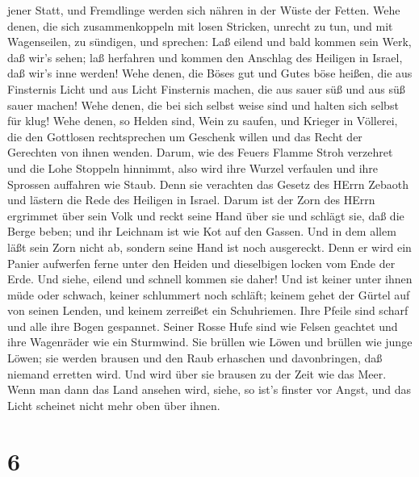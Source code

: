 jener Statt, und Fremdlinge werden sich nähren in der Wüste der Fetten.
 Wehe denen, die sich zusammenkoppeln mit losen Stricken,
unrecht zu tun, und mit Wagenseilen, zu sündigen,  und
sprechen: Laß eilend und bald kommen sein Werk, daß wir's sehen; laß
herfahren und kommen den Anschlag des Heiligen in Israel, daß wir's inne
werden!  Wehe denen, die Böses gut und Gutes böse heißen,
die aus Finsternis Licht und aus Licht Finsternis machen, die aus sauer
süß und aus süß sauer machen!  Wehe denen, die bei sich
selbst weise sind und halten sich selbst für klug!  Wehe
denen, so Helden sind, Wein zu saufen, und Krieger in Völlerei,
 die den Gottlosen rechtsprechen um Geschenk willen und das
Recht der Gerechten von ihnen wenden.  Darum, wie des
Feuers Flamme Stroh verzehret und die Lohe Stoppeln hinnimmt, also wird
ihre Wurzel verfaulen und ihre Sprossen auffahren wie Staub. Denn sie
verachten das Gesetz des HErrn Zebaoth und lästern die Rede des Heiligen
in Israel.  Darum ist der Zorn des HErrn ergrimmet über
sein Volk und reckt seine Hand über sie und schlägt sie, daß die Berge
beben; und ihr Leichnam ist wie Kot auf den Gassen. Und in dem allem
läßt sein Zorn nicht ab, sondern seine Hand ist noch ausgereckt.
 Denn er wird ein Panier aufwerfen ferne unter den Heiden
und dieselbigen locken vom Ende der Erde. Und siehe, eilend und schnell
kommen sie daher!  Und ist keiner unter ihnen müde oder
schwach, keiner schlummert noch schläft; keinem gehet der Gürtel auf von
seinen Lenden, und keinem zerreißet ein Schuhriemen.  Ihre
Pfeile sind scharf und alle ihre Bogen gespannet. Seiner Rosse Hufe sind
wie Felsen geachtet und ihre Wagenräder wie ein Sturmwind. 
Sie brüllen wie Löwen und brüllen wie junge Löwen; sie werden brausen
und den Raub erhaschen und davonbringen, daß niemand erretten wird.
 Und wird über sie brausen zu der Zeit wie das Meer. Wenn
man dann das Land ansehen wird, siehe, so ist's finster vor Angst, und
das Licht scheinet nicht mehr oben über ihnen.

\hypertarget{section-5}{%
\section{6}\label{section-5}}

